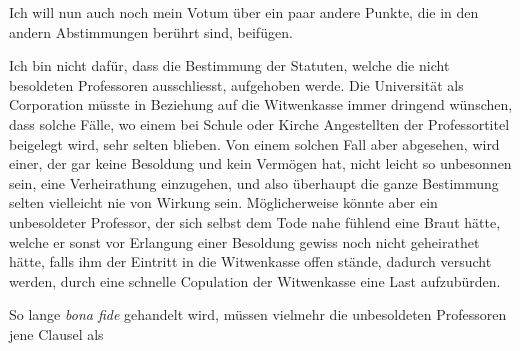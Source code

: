 Ich will nun auch noch mein Votum über ein paar andere Punkte, die in den andern Abstimmungen berührt sind, beifügen.

Ich bin nicht dafür, dass die Bestimmung der Statuten, welche die nicht besoldeten Professoren ausschliesst, aufgehoben werde. Die Universität als Corporation müsste in Beziehung auf die Witwenkasse immer dringend wünschen, dass solche Fälle, wo einem bei Schule oder Kirche Angestellten der Professortitel beigelegt wird, sehr selten blieben. Von einem solchen Fall aber abgesehen, wird einer, der gar keine Besoldung und kein Vermögen hat, nicht leicht so unbesonnen sein, eine Verheirathung einzugehen, und also überhaupt die ganze Bestimmung selten vielleicht nie von Wirkung sein. Möglicherweise könnte aber ein unbesoldeter Professor, der sich selbst dem Tode nahe fühlend eine Braut hätte, welche er sonst vor Erlangung einer Besoldung gewiss noch nicht geheirathet hätte, falls ihm der Eintritt in die Witwenkasse offen stände, dadurch versucht werden, durch eine schnelle Copulation der Witwenkasse eine Last aufzubürden.

So lange \textit{bona fide} gehandelt wird, müssen vielmehr die unbesoldeten Professoren jene Clausel als
